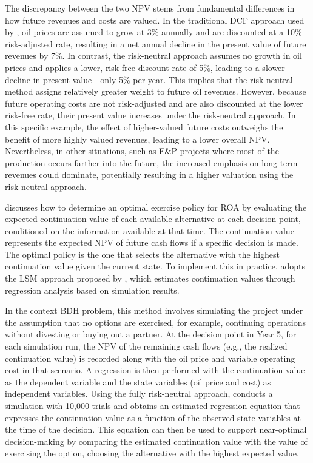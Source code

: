 \documentclass[pdflatex,sn-basic]{sn-jnl}%
\theoremstyle{thmstyleone}%
\theoremstyle{thmstyletwo}%
\theoremstyle{thmstylethree}%
\begin{document}
The discrepancy between the two NPV stems from fundamental differences in how future revenues and costs are valued. In the traditional DCF approach used by \cite{ref12a}, oil prices are assumed to grow at 3\% annually and are discounted at a 10\% risk-adjusted rate, resulting in a net annual decline in the present value of future revenues by 7\%. In contrast, the risk-neutral approach assumes no growth in oil prices and applies a lower, risk-free discount rate of 5\%, leading to a slower decline in present value—only 5\% per year. This implies that the risk-neutral method assigns relatively greater weight to future oil revenues. However, because future operating costs are not risk-adjusted and are also discounted at the lower risk-free rate, their present value increases under the risk-neutral approach. In this specific example, the effect of higher-valued future costs outweighs the benefit of more highly valued revenues, leading to a lower overall NPV. Nevertheless, in other situations, such as E\&P projects where most of the production occurs farther into the future, the increased emphasis on long-term revenues could dominate, potentially resulting in a higher valuation using the risk-neutral approach.

\cite{ref13} discusses how to determine an optimal exercise policy for ROA by evaluating the expected continuation value of each available alternative at each decision point, conditioned on the information available at that time. The continuation value represents the expected NPV of future cash flows if a specific decision is made. The optimal policy is the one that selects the alternative with the highest continuation value given the current state. To implement this in practice, \cite{ref13} adopts the LSM approach proposed by \cite{ref14}, which estimates continuation values through regression analysis based on simulation results.

In the context BDH problem, this method involves simulating the project under the assumption that no options are exercised, for example, continuing operations without divesting or buying out a partner. At the decision point in Year 5, for each simulation run, the NPV of the remaining cash flows (e.g., the realized continuation value) is recorded along with the oil price and variable operating cost in that scenario. A regression is then performed with the continuation value as the dependent variable and the state variables (oil price and cost) as independent variables. Using the fully risk-neutral approach, \cite{ref13} conducts a simulation with 10,000 trials and obtains an estimated regression equation that expresses the continuation value as a function of the observed state variables at the time of the decision. This equation can then be used to support near-optimal decision-making by comparing the estimated continuation value with the value of exercising the option, choosing the alternative with the highest expected value.
\end{document}

